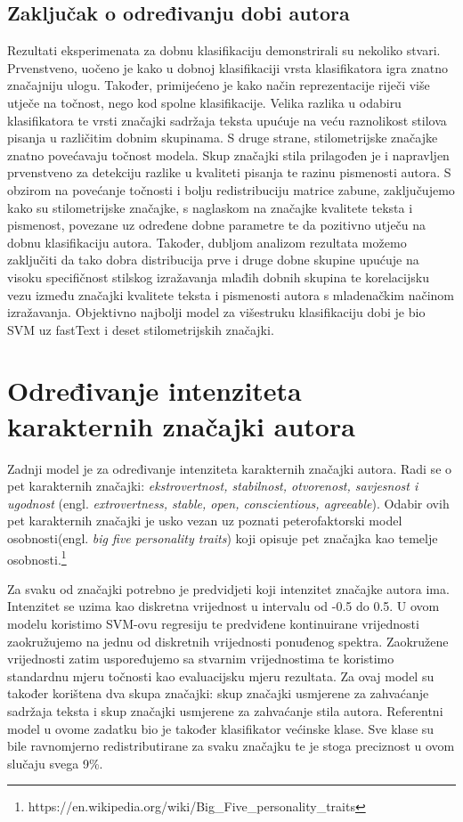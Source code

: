\documentclass[times, utf8, zavrsni]{fer}
\begin{document}
\subsection*{Zaključak o određivanju dobi autora}

Rezultati eksperimenata za dobnu klasifikaciju demonstrirali su nekoliko stvari. Prvenstveno, uočeno je kako u dobnoj klasifikaciji vrsta klasifikatora igra znatno značajniju ulogu. Također, primijećeno je kako način reprezentacije riječi više utječe na točnost, nego kod spolne klasifikacije. Velika razlika u odabiru klasifikatora te vrsti značajki sadržaja teksta upućuje na veću raznolikost stilova pisanja u različitim dobnim skupinama. S druge strane, stilometrijske značajke znatno povećavaju točnost modela. Skup značajki stila prilagođen je i napravljen prvenstveno za detekciju razlike u kvaliteti pisanja te razinu pismenosti autora. S obzirom na povećanje točnosti i bolju  redistribuciju matrice zabune, zaključujemo kako su stilometrijske značajke, s naglaskom na značajke kvalitete teksta i pismenost, povezane uz određene dobne parametre te da pozitivno utječu na dobnu klasifikaciju autora. Također, dubljom analizom rezultata možemo zaključiti da tako dobra distribucija prve i druge dobne skupine upućuje na visoku specifičnost stilskog izražavanja mlađih dobnih skupina te korelacijsku vezu između značajki kvalitete teksta i pismenosti autora s mladenačkim načinom izražavanja. Objektivno najbolji model za višestruku klasifikaciju dobi je bio SVM uz fastText i deset stilometrijskih značajki.

\newpage



\section{Određivanje intenziteta karakternih značajki autora}

Zadnji model je za određivanje intenziteta karakternih značajki autora. Radi se o pet karakternih značajki: \textit{ekstrovertnost, stabilnost, otvorenost, savjesnost i ugodnost} (engl. \textit{extrovertness, stable, open, conscientious, agreeable}). Odabir ovih pet karakternih značajki je usko vezan uz poznati peterofaktorski model osobnosti(engl. \textit{big five personality traits}) koji opisuje pet značajka kao temelje osobnosti.\footnote{https://en.wikipedia.org/wiki/Big\_Five\_personality\_traits}

Za svaku od značajki potrebno je predvidjeti koji intenzitet značajke autora ima. Intenzitet se uzima kao diskretna vrijednost u intervalu od -0.5 do 0.5.  U ovom modelu koristimo SVM-ovu regresiju te predviđene kontinuirane vrijednosti zaokružujemo na jednu od diskretnih vrijednosti ponuđenog spektra. Zaokružene vrijednosti zatim uspoređujemo sa stvarnim vrijednostima te koristimo standardnu mjeru točnosti kao evaluacijsku mjeru rezultata. Za ovaj model su također korištena dva skupa značajki: skup značajki usmjerene za zahvaćanje sadržaja teksta i skup značajki usmjerene za zahvaćanje stila autora. Referentni model u ovome zadatku bio je također klasifikator većinske klase. Sve klase su bile ravnomjerno redistributirane za svaku značajku te je stoga preciznost u ovom slučaju svega 9\%.  
\end{document}
